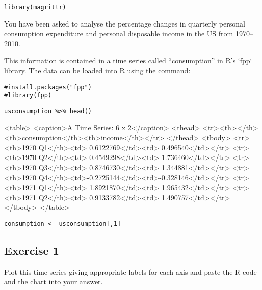 \documentclass[a4paper,12pt]{article}
\begin{document}
\begin{framed} \begin{verbatim}
library(magrittr)
\end{verbatim}\end{framed}


You have been asked to analyse the percentage changes in quarterly personal
consumption expenditure and personal disposable income in the US from 1970–2010.

This information is contained in a time series called “consumption” in R’s `{fpp}` library.
The data can be loaded into R using the command:




\begin{framed} \begin{verbatim}
#install.packages("fpp")
#library(fpp)
\end{verbatim}\end{framed}


\begin{framed} \begin{verbatim}
usconsumption %>% head()
\end{verbatim}\end{framed}


<table>
<caption>A Time Series: 6 x 2</caption>
<thead>
	<tr><th></th><th>consumption</th><th>income</th></tr>
</thead>
<tbody>
	<tr><th>1970 Q1</th><td> 0.6122769</td><td> 0.496540</td></tr>
	<tr><th>1970 Q2</th><td> 0.4549298</td><td> 1.736460</td></tr>
	<tr><th>1970 Q3</th><td> 0.8746730</td><td> 1.344881</td></tr>
	<tr><th>1970 Q4</th><td>-0.2725144</td><td>-0.328146</td></tr>
	<tr><th>1971 Q1</th><td> 1.8921870</td><td> 1.965432</td></tr>
	<tr><th>1971 Q2</th><td> 0.9133782</td><td> 1.490757</td></tr>
</tbody>
</table>




\begin{framed} \begin{verbatim}
consumption <- usconsumption[,1]
\end{verbatim}\end{framed}

\newpage 
\subsection*{Exercise 1}

Plot this time series giving appropriate labels for each axis and paste the R
code and the chart into your answer.
\end{document}
